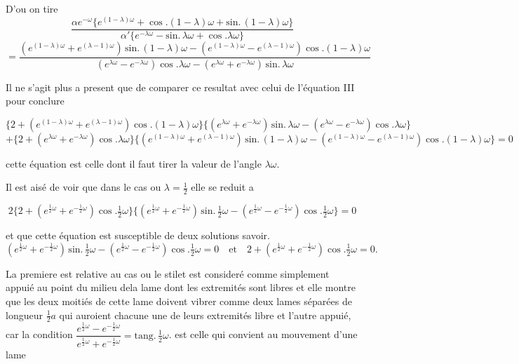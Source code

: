 \documentclass[11pt,a4paper]{article}
\begin{document}

D'ou on tire
\[ \frac{\alpha e^{-\omega}\{e^{(1-\lambda)\omega}+\cos.(1-\lambda)\omega+\text{sin.}\,(1-\lambda)\omega\}}{\alpha'\{e^{-\lambda\omega}-\text{sin.}\,\lambda\omega+\cos.\lambda\omega\}} \]
\[ =\frac{(e^{(1-\lambda)\omega}+e^{(\lambda-1)\omega})\,\text{sin.}\,(1-\lambda)\omega-(e^{(1-\lambda)\omega}-e^{(\lambda-1)\omega})\cos.(1-\lambda)\omega}{(e^{\lambda\omega}-e^{-\lambda\omega})\cos.\lambda\omega-(e^{\lambda\omega}+e^{-\lambda\omega})\,\text{sin.}\,\lambda\omega} \]

Il ne s'agit plus a present que de comparer ce resultat avec celui de
l'équation III pour conclure

\[ \{2+(e^{(1-\lambda)\omega}+e^{(\lambda-1)\omega})\cos.(1-\lambda)\omega\}\{(e^{\lambda\omega}+e^{-\lambda\omega})\,\text{sin.}\,\lambda\omega-(e^{\lambda\omega}-e^{-\lambda\omega})\cos.\lambda\omega\} \]
\[ +\{2+(e^{\lambda\omega}+e^{-\lambda\omega})\cos.\lambda\omega\}\{(e^{(1-\lambda)\omega}+e^{(\lambda-1)\omega})\,\text{sin.}\,(1-\lambda)\omega-(e^{(1-\lambda)\omega}-e^{(\lambda-1)\omega})\cos.(1-\lambda)\omega\}=0 \]

cette équation est celle dont il faut tirer la valeur de l'angle $\lambda\omega$.

Il est aisé de voir que dans le cas ou $\lambda=\frac{1}{2}$ elle se reduit a

\[ 2\{2+(e^{\frac{1}{2}\omega}+e^{-\frac{1}{2}\omega})\cos.\tfrac{1}{2}\omega\}\{(e^{\frac{1}{2}\omega}+e^{-\frac{1}{2}\omega})\,\text{sin.}\,\tfrac{1}{2}\omega-(e^{\frac{1}{2}\omega}-e^{-\frac{1}{2}\omega})\cos.\tfrac{1}{2}\omega\}=0 \]

et que cette équation est susceptible de deux solutions savoir.
\[ (e^{\frac{1}{2}\omega}+e^{-\frac{1}{2}\omega})\,\text{sin.}\,\tfrac{1}{2}\omega-(e^{\frac{1}{2}\omega}-e^{-\frac{1}{2}\omega})\cos.\tfrac{1}{2}\omega=0 \quad\text{et}\quad 2+(e^{\frac{1}{2}\omega}+e^{-\frac{1}{2}\omega})\cos.\tfrac{1}{2}\omega=0. \]

La premiere est relative au cas ou le stilet est  consideré
comme simplement appuié au point du milieu dela lame dont les extremités sont
libres et elle montre que les deux moitiés de cette lame doivent vibrer comme
deux lames séparées de longueur $\frac{1}{2}a$ qui auroient chacune une de
leurs extremités libre et l'autre appuié, car la condition
$\dfrac{e^{\frac{1}{2}\omega}-e^{-\frac{1}{2}\omega}}{e^{\frac{1}{2}\omega}+e^{-\frac{1}{2}\omega}}=\text{tang.}\,\tfrac{1}{2}\omega$.
est celle qui convient au mouvement d'une  lame
\end{document}
